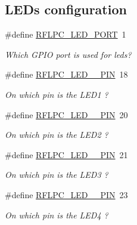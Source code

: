 \subsection*{L\-E\-Ds configuration}
\begin{DoxyCompactItemize}
\item 
\hypertarget{group__config_gafc180ae44e9f400ffb8dd696d5b91c0e}{\#define \hyperlink{group__config_gafc180ae44e9f400ffb8dd696d5b91c0e}{R\-F\-L\-P\-C\-\_\-\-L\-E\-D\-\_\-\-P\-O\-R\-T}~1}\label{group__config_gafc180ae44e9f400ffb8dd696d5b91c0e}

\begin{DoxyCompactList}\small\item\em Which G\-P\-I\-O port is used for leds? \end{DoxyCompactList}\item 
\hypertarget{group__config_gaf2f44df1da41d405749c104714d685b3}{\#define \hyperlink{group__config_gaf2f44df1da41d405749c104714d685b3}{R\-F\-L\-P\-C\-\_\-\-L\-E\-D\-\_\-\_\-\-P\-I\-N}~18}\label{group__config_gaf2f44df1da41d405749c104714d685b3}

\begin{DoxyCompactList}\small\item\em On which pin is the L\-E\-D1 ? \end{DoxyCompactList}\item 
\hypertarget{group__config_ga6faf6042aee47250aa8581072c96ef71}{\#define \hyperlink{group__config_ga6faf6042aee47250aa8581072c96ef71}{R\-F\-L\-P\-C\-\_\-\-L\-E\-D\-\_\-\_\-\-P\-I\-N}~20}\label{group__config_ga6faf6042aee47250aa8581072c96ef71}

\begin{DoxyCompactList}\small\item\em On which pin is the L\-E\-D2 ? \end{DoxyCompactList}\item 
\hypertarget{group__config_ga81cffd6a00d32da136b5852b70bab8e6}{\#define \hyperlink{group__config_ga81cffd6a00d32da136b5852b70bab8e6}{R\-F\-L\-P\-C\-\_\-\-L\-E\-D\-\_\-\_\-\-P\-I\-N}~21}\label{group__config_ga81cffd6a00d32da136b5852b70bab8e6}

\begin{DoxyCompactList}\small\item\em On which pin is the L\-E\-D3 ? \end{DoxyCompactList}\item 
\hypertarget{group__config_gaa2342a982cef2535071bfb723e6694e0}{\#define \hyperlink{group__config_gaa2342a982cef2535071bfb723e6694e0}{R\-F\-L\-P\-C\-\_\-\-L\-E\-D\-\_\-\_\-\-P\-I\-N}~23}\label{group__config_gaa2342a982cef2535071bfb723e6694e0}

\begin{DoxyCompactList}\small\item\em On which pin is the L\-E\-D4 ? \end{DoxyCompactList}\end{DoxyCompactItemize}

